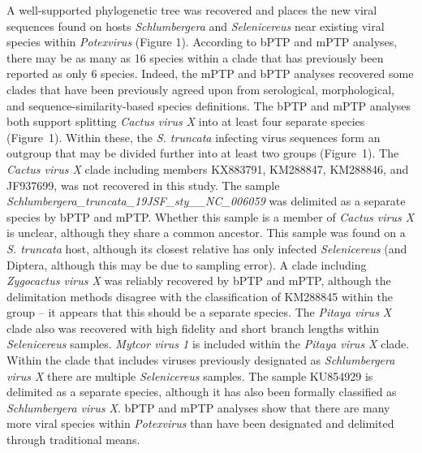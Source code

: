 \documentclass[fleqn,10pt,lineno]{wlpeerj}
\begin{document}
A well-supported phylogenetic tree was recovered and places the new viral sequences found on hosts \textit{Schlumbergera} and \textit{Selenicereus} near existing viral species within \textit{Potexvirus} (Figure 1). 
According to bPTP and mPTP analyses, there may be as many as 16 species within a clade that has previously been reported as only 6 species. 
Indeed, the mPTP and bPTP analyses recovered some clades that have been previously agreed upon from serological, morphological, and sequence-similarity-based species definitions.
The bPTP and mPTP analyses both support splitting \textit{Cactus virus X} into at least four separate species (Figure~1).
Within these, the \textit{S. truncata} infecting virus sequences form an outgroup that may be divided further into at least two groups (Figure~1).
The \textit{Cactus virus X} clade including members KX883791, KM288847, KM288846, and JF937699, was not recovered in this study. 
The sample \textit{Schlumbergera\_truncata\_19JSF\_sty\_\_NC\_006059} was delimited as a separate species by bPTP and mPTP. 
Whether this sample is a member of \textit{Cactus virus X} is unclear, although they share a common ancestor. 
This sample was found on a \textit{S. truncata} host, although its closest relative has only infected \textit{Selenicereus} (and Diptera, although this may be due to sampling error).
A clade including \textit{Zygocactus virus X} was reliably recovered by bPTP and mPTP, although the delimitation methods disagree with the classification of KM288845 within the group -- it appears that this should be a separate species. 
The \textit{Pitaya virus X} clade also was recovered with high fidelity and short branch lengths within \textit{Selenicereus} samples. 
\textit{Mytcor virus 1} is included within the \textit{Pitaya virus X} clade. 
Within the clade that includes viruses previously designated as \textit{Schlumbergera virus X} there are multiple \textit{Selenicereus} samples.
The sample KU854929 is delimited as a separate species, although it has also been formally classified as \textit{Schlumbergera virus X}.
bPTP and mPTP analyses show that there are many more viral species within \textit{Potexvirus} than have been designated and delimited through traditional means.
\end{document}
